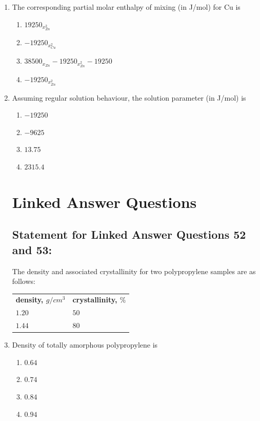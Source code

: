 \documentclass[journal]{IEEEtran}
\theoremstyle{remark}
\begin{document}
\begin{enumerate}
\item The corresponding partial molar enthalpy of mixing (in J/mol) for Cu is \hfill{}
\begin{multicols}{2}
\begin{enumerate}
\item $19250_{x^2_{Zn}}$
\item  $-19250_{x^2_{Cu}}$
\item  $38500_{x_{Zn}}- 19250_{x^2_{Zn}}-19250$
\item  $-19250_{x^2_{Zn}}$
\end{enumerate}
\end{multicols}
\item Assuming regular solution behaviour, the solution parameter (in J/mol) is \hfill{}
\begin{multicols}{4}
\begin{enumerate}
\item $-19250 $
\item  $ -9625$
\item  $ 13.75 $
\item  $2315.4 $
\end{enumerate}
\end{multicols}
\section*{Linked Answer Questions }
\subsection*{Statement for Linked Answer Questions 52 and 53: }
The density and associated crystallinity for two polypropylene samples are as follows: 
\begin{center}
    \begin{tabular}{ll}
      \textbf{density, $g/cm^3$  } & \textbf{crystallinity, $\%$} \\
    $1.20$  & $50$ \\
     $1.44$ &  $80$ \\
    \end{tabular}
\end{center}
\item   Density of totally amorphous polypropylene is
\hfill{}
\begin{multicols}{4}
\begin{enumerate}
\item    $0.64$
\item $0.74$
\item  $ 0.84$ 
\item $0.94$
\end{enumerate}
\end{multicols}


\end{enumerate}
\end{document}
